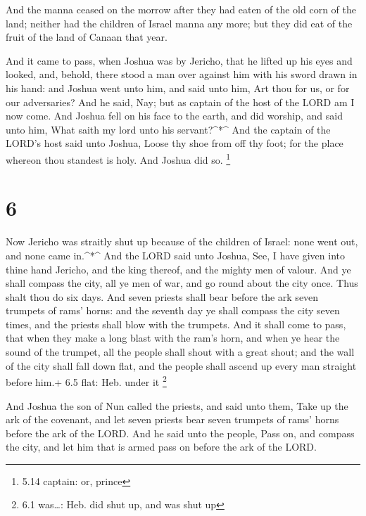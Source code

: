  And the manna ceased on the morrow after they had eaten of
the old corn of the land; neither had the children of Israel manna any
more; but they did eat of the fruit of the land of Canaan that year.

 And it came to pass, when Joshua was by Jericho, that he
lifted up his eyes and looked, and, behold, there stood a man over
against him with his sword drawn in his hand: and Joshua went unto him,
and said unto him, Art thou for us, or for our adversaries?
 And he said, Nay; but as captain of the host of the LORD
am I now come. And Joshua fell on his face to the earth, and did
worship, and said unto him, What saith my lord unto his
servant?\^{}*\^{}  And the captain of the LORD's host said
unto Joshua, Loose thy shoe from off thy foot; for the place whereon
thou standest is holy. And Joshua did so. \footnote{5.14 captain: or,
  prince}

\hypertarget{section-5}{%
\section{6}\label{section-5}}

 Now Jericho was straitly shut up because of the children of
Israel: none went out, and none came in.\^{}*\^{}  And the
LORD said unto Joshua, See, I have given into thine hand Jericho, and
the king thereof, and the mighty men of valour.  And ye
shall compass the city, all ye men of war, and go round about the city
once. Thus shalt thou do six days.  And seven priests shall
bear before the ark seven trumpets of rams' horns: and the seventh day
ye shall compass the city seven times, and the priests shall blow with
the trumpets.  And it shall come to pass, that when they
make a long blast with the ram's horn, and when ye hear the sound of the
trumpet, all the people shall shout with a great shout; and the wall of
the city shall fall down flat, and the people shall ascend up every man
straight before him.+ 6.5 flat: Heb. under it \footnote{6.1 was\ldots:
  Heb. did shut up, and was shut up}

 And Joshua the son of Nun called the priests, and said unto
them, Take up the ark of the covenant, and let seven priests bear seven
trumpets of rams' horns before the ark of the LORD.  And he
said unto the people, Pass on, and compass the city, and let him that is
armed pass on before the ark of the LORD.

